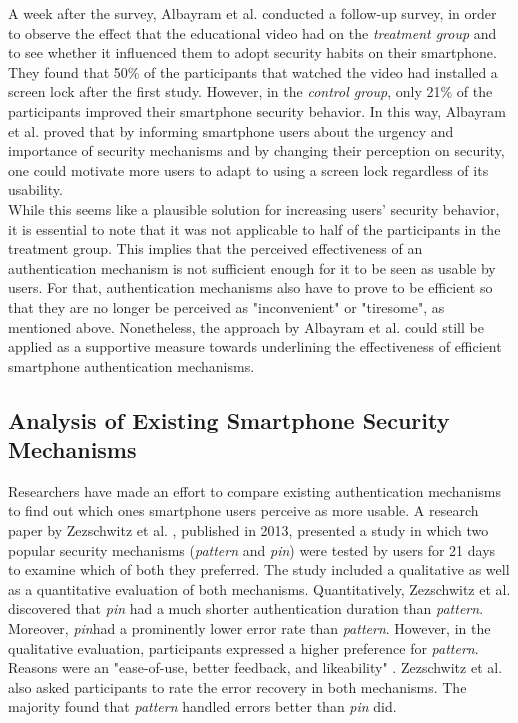 A week after the survey, Albayram et al. \cite{Albayram:2017:BUL:3235924.3235929} conducted a follow-up survey, in order to observe the effect that the educational video had on the \textit{treatment group} and to see whether it influenced them to adopt security habits on their smartphone. They found that 50\% of the participants that watched the video had installed a screen lock after the first study. However, in the \textit{control group}, only 21\% of the participants improved their smartphone security behavior. In this way, Albayram et al. \cite{Albayram:2017:BUL:3235924.3235929} proved that by informing smartphone users about the urgency and importance of security mechanisms and by changing their perception on security, one could motivate more users to adapt to using a screen lock regardless of its usability. \\

While this seems like a plausible solution for increasing users' security behavior, it is essential to note that it was not applicable to half of the participants in the treatment group. This implies that the perceived effectiveness of an authentication mechanism is not sufficient enough for it to be seen as usable by users. For that, authentication mechanisms also have to prove to be efficient so that they are no longer be perceived as "inconvenient" or "tiresome", as mentioned above. Nonetheless, the approach by Albayram et al. \cite{Albayram:2017:BUL:3235924.3235929} could still be applied as a supportive measure towards underlining the effectiveness of efficient smartphone authentication mechanisms. 

\subsection{Analysis of Existing Smartphone Security Mechanisms} \label{2.2.2}

Researchers have made an effort to compare existing authentication mechanisms to find out which ones smartphone users perceive as more usable. A research paper by Zezschwitz et al. \cite{PatternWild}, published in 2013, presented a study in which two popular security mechanisms (\textit{pattern} and \textit{pin}) were tested by users for 21 days to examine which of both they preferred. The study included a qualitative as well as a quantitative evaluation of both mechanisms. Quantitatively, Zezschwitz et al. \cite{PatternWild} discovered that \textit{pin} had a much shorter authentication duration than \textit{pattern}. Moreover, \textit{pin}had a prominently lower error rate than \textit{pattern}. However, in the qualitative evaluation, participants expressed a higher preference for \textit{pattern}. Reasons were an "ease-of-use, better feedback, and likeability" \cite{PatternWild}. Zezschwitz et al. \cite{PatternWild} also asked participants to rate the error recovery in both mechanisms. The majority found that \textit{pattern} handled errors better than \textit{pin} did.\\

